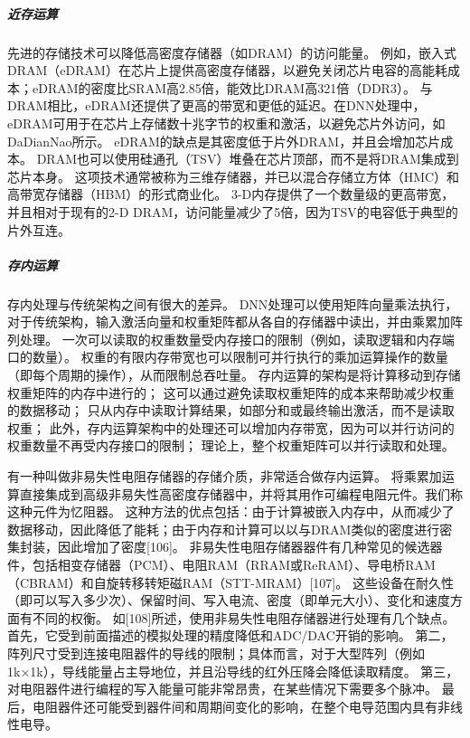 \subparagraph{近存运算}
先进的存储技术可以降低高密度存储器（如DRAM）的访问能量。
例如，嵌入式DRAM（eDRAM）\cite{2001Embedded}在芯片上提供高密度存储器，以避免关闭芯片电容的高能耗成本；eDRAM的密度比SRAM高2.85倍，能效比DRAM高321倍（DDR3）\cite{2017Efficient}。
与DRAM相比，eDRAM还提供了更高的带宽和更低的延迟。在DNN处理中，eDRAM可用于在芯片上存储数十兆字节的权重和激活，以避免芯片外访问，如DaDianNao\cite{2015DaDianNao}所示。
eDRAM的缺点是其密度低于片外DRAM，并且会增加芯片成本。
DRAM也可以使用硅通孔（TSV）\cite{2018The}堆叠在芯片顶部，而不是将DRAM集成到芯片本身。
这项技术通常被称为三维存储器，并已以混合存储立方体（HMC）\cite{2012Hybrid}和高带宽存储器（HBM）\cite{HBMDRAM}的形式商业化。
3-D内存提供了一个数量级的更高带宽，并且相对于现有的2-D DRAM，访问能量减少了5倍，因为TSV的电容低于典型的片外互连\cite{2017Efficient}。

\subparagraph{存内运算}
存内处理与传统架构之间有很大的差异。
DNN处理可以使用矩阵向量乘法执行，
对于传统架构，输入激活向量和权重矩阵都从各自的存储器中读出，并由乘累加阵列处理。
一次可以读取的权重数量受内存接口的限制（例如，读取逻辑和内存端口的数量）。
权重的有限内存带宽也可以限制可并行执行的乘加运算操作的数量（即每个周期的操作），从而限制总吞吐量。
存内运算的架构是将计算移动到存储权重矩阵的内存中进行的；
这可以通过避免读取权重矩阵的成本来帮助减少权重的数据移动；
只从内存中读取计算结果，如部分和或最终输出激活，而不是读取权重；
此外，存内运算架构中的处理还可以增加内存带宽，因为可以并行访问的权重数量不再受内存接口的限制；
理论上，整个权重矩阵可以并行读取和处理\cite{2017Efficient}。  

有一种叫做非易失性电阻存储器的存储介质，非常适合做存内运算。
将乘累加运算直接集成到高级非易失性高密度存储器中，并将其用作可编程电阻元件。我们称这种元件为忆阻器\cite{IEEE1971L}。
这种方法的优点包括：由于计算被嵌入内存中，从而减少了数据移动，因此降低了能耗；由于内存和计算可以以与DRAM类似的密度进行密集封装，因此增加了密度[106]。
非易失性电阻存储器器件有几种常见的候选器件，包括相变存储器（PCM）、电阻RAM（RRAM或ReRAM）、导电桥RAM（CBRAM）和自旋转移转矩磁RAM（STT-MRAM）[107]。
这些设备在耐久性（即可以写入多少次）、保留时间、写入电流、密度（即单元大小）、变化和速度方面有不同的权衡。
如[108]所述，使用非易失性电阻存储器进行处理有几个缺点。
首先，它受到前面描述的模拟处理的精度降低和ADC/DAC开销的影响。
第二，阵列尺寸受到连接电阻器件的导线的限制；具体而言，对于大型阵列（例如1k×1k），导线能量占主导地位，并且沿导线的红外压降会降低读取精度。
第三，对电阻器件进行编程的写入能量可能非常昂贵，在某些情况下需要多个脉冲。
最后，电阻器件还可能受到器件间和周期间变化的影响，在整个电导范围内具有非线性电导。


